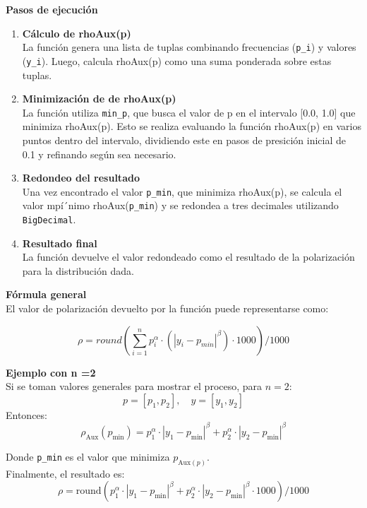 \documentclass{article}
\begin{document}
	\textbf{Pasos de ejecución }\\
	
	\begin{enumerate}
		\item \textbf{Cálculo de rhoAux(p)}\\
		La función genera una lista de tuplas combinando frecuencias (\texttt{p\_i}) y valores (\texttt{y\_i}). Luego, calcula rhoAux(p) como una suma ponderada sobre estas tuplas.
		\item \textbf{Minimización de  de rhoAux(p)}\\
		La función utiliza \texttt{min\_p}, que busca el valor de p en el intervalo [0.0, 1.0] que minimiza rhoAux(p). Esto se realiza evaluando la función rhoAux(p) en varios puntos dentro del intervalo, dividiendo este en pasos de presición inicial de 0.1 y refinando según sea necesario.
		\item \textbf{Redondeo del resultado}\\
		Una vez encontrado el valor \texttt{p\_min}, que minimiza rhoAux(p), se calcula el valor mpí´nimo rhoAux(\texttt{p\_min}) y se redondea a tres decimales utilizando \texttt{BigDecimal}.
		\item \textbf{Resultado final}\\
		La función devuelve el valor redondeado como el resultado de la polarización para la distribución dada.
	\end{enumerate}

	\textbf{Fórmula general}\\
	El valor de polarización devuelto por la función puede representarse como:
	
	\[
	\rho = round (\sum_{i=1}^n p_i^\alpha \cdot ( |y_i - p_{min}|^\beta) \cdot 1000) /1000
	\]  

	\textbf{Ejemplo con n =2}\\
	
	Si se toman valores generales para mostrar el proceso, para $n = 2$:  
	\[
	p = [p_1, p_2], \quad y = [y_1, y_2]
	\]  
	Entonces:  
	\[
	\rho_{\text{Aux}}(p_{\text{min}}) = p_1^\alpha \cdot |y_1 - p_{\text{min}}|^\beta + p_2^\alpha \cdot |y_2 - p_{\text{min}}|^\beta
	\]  
	
	Donde \texttt{p\_min} es el valor que minimiza $p_{\text{Aux}(p)}$. \\
	Finalmente, el resultado es:
	\[
	\rho = \text{round}\left(p_1^\alpha \cdot |y_1 - p_{\text{min}}|^\beta + p_2^\alpha \cdot |y_2 - p_{\text{min}}|^\beta \cdot 1000\right) / 1000
	\]  
	
\end{document}
